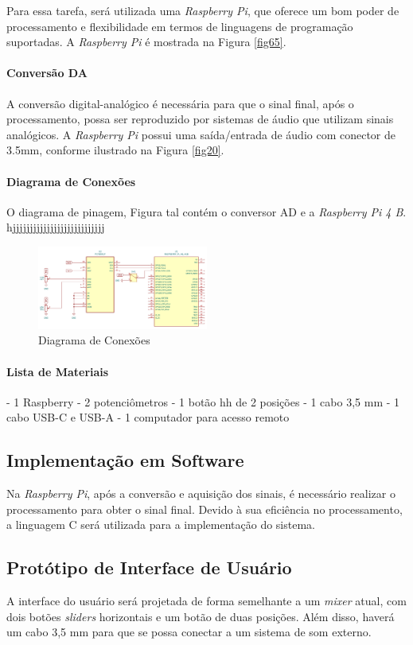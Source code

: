 Para essa tarefa, será utilizada uma \textit{Raspberry Pi}, que oferece um bom poder de processamento e flexibilidade em termos de linguagens de programação suportadas. A \textit{Raspberry Pi} é mostrada na Figura \ref{fig65}.

\paragraph*{Conversão DA}

A conversão digital-analógico é necessária para que o sinal final, após o processamento, possa ser reproduzido por sistemas de áudio que utilizam sinais analógicos. A \textit{Raspberry Pi} possui uma saída/entrada de áudio com conector de 3.5mm, conforme ilustrado na Figura \ref{fig20}.

\paragraph*{Diagrama de Conexões}

O diagrama de pinagem, Figura tal  contém o conversor AD e a \textit{Raspberry Pi 4 B}. hjjjjjjjjjjjjjjjjjjjjjjjjjjj

\begin{figure}[h]
    \centering
    \includegraphics[width=0.5\textwidth]{figuras/fig80.png}
    \caption{Diagrama de Conexões}
    \label{fig80}
\end{figure}

\paragraph*{Lista de Materiais}
- 1 Raspberry
- 2 potenciômetros
- 1 botão hh de 2 posições
- 1 cabo 3,5 mm
- 1 cabo USB-C e USB-A
- 1 computador para acesso remoto


\subsection{Implementação em Software}

Na \textit{Raspberry Pi}, após a conversão e aquisição dos sinais, é necessário realizar o processamento para obter o sinal final. Devido à sua eficiência no processamento, a linguagem C será utilizada para a implementação do sistema.

\subsection{Protótipo de Interface de Usuário}

A interface do usuário será projetada de forma semelhante a um \textit{mixer} atual, com dois botões \textit{sliders} horizontais e um botão de duas posições. Além disso, haverá um cabo 3,5 mm para que se possa conectar a um sistema de som externo.

